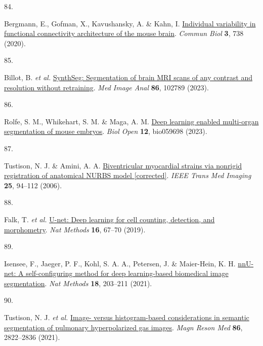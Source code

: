 \documentclass[
  12pt,
]{article}
\newlength{\cslhangindent}
\newlength{\csllabelwidth}
\newenvironment{CSLReferences}[2] %
 {\begin{list}{}{%
  \setlength{\itemindent}{0pt}
  \setlength{\leftmargin}{0pt}
  \setlength{\parsep}{0pt}
  \ifodd #1
   \setlength{\leftmargin}{\cslhangindent}
   \setlength{\itemindent}{-1\cslhangindent}
  \fi
  \setlength{\itemsep}{#2\baselineskip}}}
 {\end{list}}
\newcommand{\CSLLeftMargin}[1]{\parbox[t]{\csllabelwidth}{\strut#1\strut}}
\newcommand{\CSLRightInline}[1]{\parbox[t]{\linewidth - \csllabelwidth}{\strut#1\strut}}
\begin{document}
\begin{CSLReferences}{0}{0}
\CSLLeftMargin{84. }%
\CSLRightInline{Bergmann, E., Gofman, X., Kavushansky, A. \& Kahn, I.
\href{https://doi.org/10.1038/s42003-020-01472-5}{Individual variability
in functional connectivity architecture of the mouse brain}.
\emph{Commun Biol} \textbf{3}, 738 (2020).}

\CSLLeftMargin{85. }%
\CSLRightInline{Billot, B. \emph{et al.}
\href{https://doi.org/10.1016/j.media.2023.102789}{SynthSeg:
Segmentation of brain MRI scans of any contrast and resolution without
retraining}. \emph{Med Image Anal} \textbf{86}, 102789 (2023).}

\CSLLeftMargin{86. }%
\CSLRightInline{Rolfe, S. M., Whikehart, S. M. \& Maga, A. M.
\href{https://doi.org/10.1242/bio.059698}{Deep learning enabled
multi-organ segmentation of mouse embryos}. \emph{Biol Open}
\textbf{12}, bio059698 (2023).}

\CSLLeftMargin{87. }%
\CSLRightInline{Tustison, N. J. \& Amini, A. A.
\href{https://doi.org/10.1109/TMI.2005.861015}{Biventricular myocardial
strains via nonrigid registration of anatomical {NURBS} model
{[}corrected{]}}. \emph{IEEE Trans Med Imaging} \textbf{25}, 94--112
(2006).}

\CSLLeftMargin{88. }%
\CSLRightInline{Falk, T. \emph{et al.}
\href{https://doi.org/10.1038/s41592-018-0261-2}{U-net: Deep learning
for cell counting, detection, and morphometry}. \emph{Nat Methods}
\textbf{16}, 67--70 (2019).}

\CSLLeftMargin{89. }%
\CSLRightInline{Isensee, F., Jaeger, P. F., Kohl, S. A. A., Petersen, J.
\& Maier-Hein, K. H.
\href{https://doi.org/10.1038/s41592-020-01008-z}{nnU-net: A
self-configuring method for deep learning-based biomedical image
segmentation}. \emph{Nat Methods} \textbf{18}, 203--211 (2021).}

\CSLLeftMargin{90. }%
\CSLRightInline{Tustison, N. J. \emph{et al.}
\href{https://doi.org/10.1002/mrm.28908}{Image- versus histogram-based
considerations in semantic segmentation of pulmonary hyperpolarized gas
images}. \emph{Magn Reson Med} \textbf{86}, 2822--2836 (2021).}

\end{CSLReferences}
\end{document}
